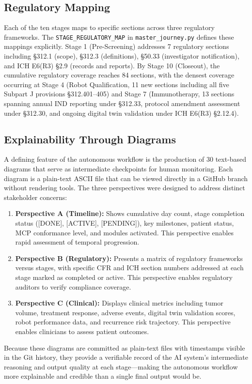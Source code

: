 \documentclass{article}
\begin{document}
\subsection{Regulatory Mapping}
\label{sec:regulatory-mapping}

Each of the ten stages maps to specific sections across three regulatory frameworks. The \texttt{STAGE\_REGULATORY\_MAP} in \texttt{master\_journey.py} defines these mappings explicitly. Stage 1 (Pre-Screening) addresses 7 regulatory sections including \S312.1 (scope), \S312.3 (definitions), \S50.33 (investigator notification), and ICH E6(R3) \S2.9 (records and reports). By Stage 10 (Closeout), the cumulative regulatory coverage reaches 84 sections, with the densest coverage occurring at Stage 4 (Robot Qualification, 11 new sections including all five Subpart J provisions \S312.401--405) and Stage 7 (Immunotherapy, 13 sections spanning annual IND reporting under \S312.33, protocol amendment assessment under \S312.30, and ongoing digital twin validation under ICH E6(R3) \S2.12.4).

\subsection{Explainability Through Diagrams}
\label{sec:explainability}

A defining feature of the autonomous workflow is the production of 30 text-based diagrams that serve as intermediate checkpoints for human monitoring. Each diagram is a plain-text ASCII file that can be viewed directly in a GitHub branch without rendering tools. The three perspectives were designed to address distinct stakeholder concerns:

\begin{enumerate}[leftmargin=*]
\item \textbf{Perspective A (Timeline):} Shows cumulative day count, stage completion status ([DONE], [ACTIVE], [PENDING]), key milestones, patient status, MCP conformance level, and modules activated. This perspective enables rapid assessment of temporal progression.

\item \textbf{Perspective B (Regulatory):} Presents a matrix of regulatory frameworks versus stages, with specific CFR and ICH section numbers addressed at each stage marked as completed or active. This perspective enables regulatory auditors to verify compliance coverage.

\item \textbf{Perspective C (Clinical):} Displays clinical metrics including tumor volume, treatment response, adverse events, digital twin validation scores, robot performance data, and recurrence risk trajectory. This perspective enables clinicians to assess patient outcomes.
\end{enumerate}

Because these diagrams are committed as plain-text files with timestamps visible in the Git history, they provide a verifiable record of the AI system's intermediate reasoning and output quality at each stage---making the autonomous workflow more explainable and credible than a single final output would be.
\end{document}
